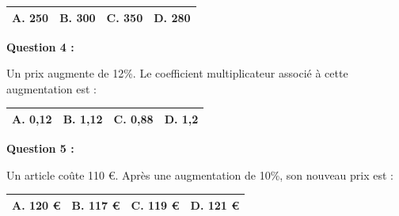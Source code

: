 \documentclass[12pt,a4paper]{article}
\begin{document}
\renewcommand{\arraystretch}{3}
\begin{tabular}{|m{3.4cm}|m{3.4cm}|m{3.4cm}|m{3.4cm}|}
\hline
\centering \vspace{-0.3cm} \textbf{A.} 250 & 
\centering \vspace{-0.3cm} \textbf{B.} 300 & 
\centering \vspace{-0.3cm} \textbf{C.} 350 & 
\centering \vspace{-0.3cm} \textbf{D.} 280 \tabularnewline
\hline
\end{tabular}

\vspace{0.7cm}

\textbf{Question 4 :}
\vspace{5pt}

Un prix augmente de 12\%. Le coefficient multiplicateur associé à cette augmentation est :

\vspace{0.3cm}

\renewcommand{\arraystretch}{3}
\begin{tabular}{|m{3.4cm}|m{3.4cm}|m{3.4cm}|m{3.4cm}|}
\hline
\centering \vspace{-0.3cm} \textbf{A.} 0,12 & 
\centering \vspace{-0.3cm} \textbf{B.} 1,12 & 
\centering \vspace{-0.3cm} \textbf{C.} 0,88 & 
\centering \vspace{-0.3cm} \textbf{D.} 1,2 \tabularnewline
\hline
\end{tabular}

\vspace{0.7cm}

\textbf{Question 5 :}
\vspace{5pt}

Un article coûte 110 €. Après une augmentation de 10\%, son nouveau prix est :
\vspace{0.3cm}

\renewcommand{\arraystretch}{3}
\begin{tabular}{|m{3.4cm}|m{3.4cm}|m{3.4cm}|m{3.4cm}|}
\hline
\centering \vspace{-0.3cm} \textbf{A.} 120 € & 
\centering \vspace{-0.3cm} \textbf{B.} 117 € & 
\centering \vspace{-0.3cm} \textbf{C.} 119 € & 
\centering \vspace{-0.3cm} \textbf{D.} 121 € \tabularnewline
\hline
\end{tabular}
\end{document}

